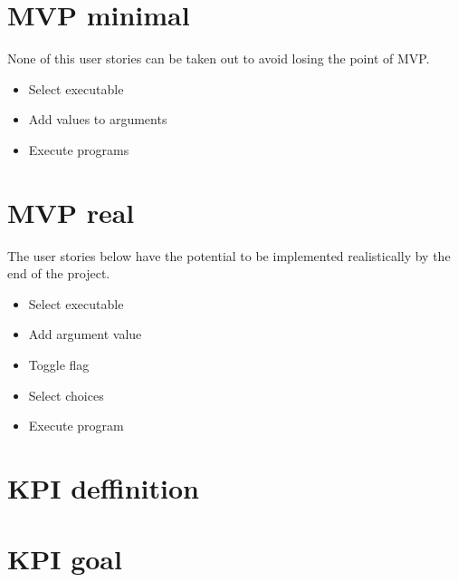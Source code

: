 \documentclass{article}
\begin{document}
\section{MVP minimal}
None of this user stories can be taken out to avoid losing the point of MVP.
\begin{itemize}
    \item Select executable
    \item Add values to arguments
    \item Execute programs
\end{itemize}

\section{MVP real}
The user stories below have the potential to be implemented realistically by the end of the project.
\begin{itemize}
    \item Select executable
    \item Add argument value
    \item Toggle flag
    \item Select choices
    \item Execute program
\end{itemize}

\section{KPI deffinition}

\section{KPI goal}
\end{document}
